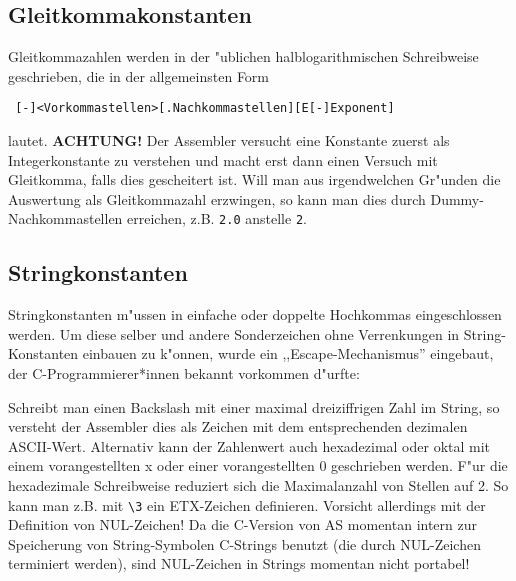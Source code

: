 \documentclass[12pt,a4paper,twoside]{report}
\newcommand{\bb}[1]{{\bf #1}}
\newcommand{\tty}[1]{{\tt #1}}
\begin{document}
\subsection{Gleitkommakonstanten}

Gleitkommazahlen werden in der "ublichen halblogarithmischen
Schreibweise geschrieben, die in der allgemeinsten Form
\begin{verbatim}
 [-]<Vorkommastellen>[.Nachkommastellen][E[-]Exponent]
\end{verbatim}
lautet. \bb{ACHTUNG!} Der Assembler versucht eine Konstante zuerst als
Integerkonstante zu verstehen und macht erst dann einen Versuch mit
Gleitkomma, falls dies gescheitert ist.  Will man aus irgendwelchen
Gr"unden die Auswertung als Gleitkommazahl erzwingen, so kann man
dies durch Dummy-Nachkommastellen erreichen, z.B. \tty{2.0} anstelle
\tty{2}.

\subsection{Stringkonstanten}
\label{SectStringConsts}

Stringkonstanten m"ussen in einfache oder doppelte Hochkommas
eingeschlossen werden.  Um diese selber und andere Sonderzeichen ohne
Verrenkungen in String-Konstanten einbauen zu k"onnen, wurde ein
,,Escape-Mechanismus'' eingebaut, der C-Programmierer*innen bekannt
vorkommen d"urfte:

Schreibt man einen Backslash mit einer maximal dreiziffrigen Zahl im
String, so versteht der Assembler dies als Zeichen mit dem entsprechenden
dezimalen ASCII-Wert.  Alternativ kann der Zahlenwert auch hexadezimal
oder oktal mit einem vorangestellten x oder einer vorangestellten 0
geschrieben werden.  F"ur die hexadezimale Schreibweise reduziert sich die
Maximalanzahl von Stellen auf 2.  So kann man z.B. mit {\tt\verb!\3!} ein
ETX-Zeichen definieren.  Vorsicht allerdings mit der Definition von
NUL-Zeichen!  Da die C-Version  von AS momentan
intern zur Speicherung von String-Symbolen C-Strings benutzt (die durch
NUL-Zeichen terminiert werden), sind NUL-Zeichen in Strings momentan nicht
portabel!
\end{document}
